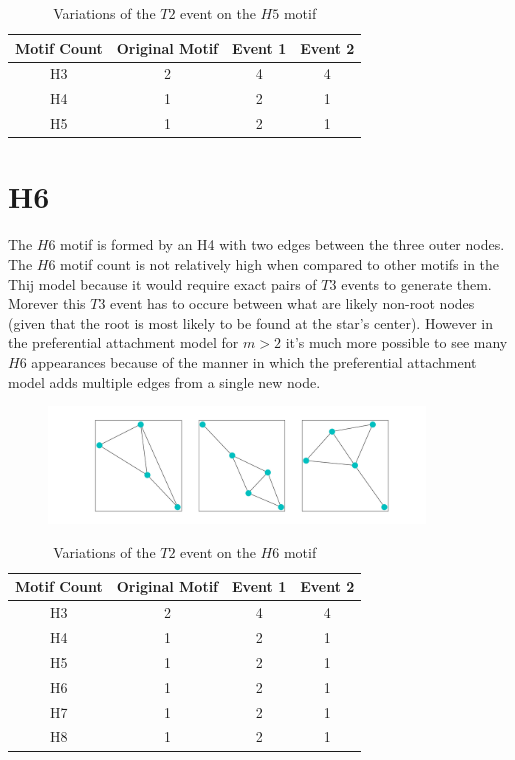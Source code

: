 \begin{table}
    \centering
    \begin{tabular}{||c c c c||} 
    \hline
    Motif Count & Original Motif & Event 1 & Event 2\\ [0.5ex] 
    \hline\hline
    H3 & 2 & 4 & 4\\ 
    \hline
    H4 & 1 & 2 & 1\\
    \hline
    H5 & 1 & 2 & 1\\
    \hline
   \end{tabular}
   \caption{Variations of the $T2$ event on the $H5$ motif}
    \label{table:3}
\end{table}


\section{H6}
The $H6$ motif is formed by an H4 with two edges between the three outer nodes.
The $H6$ motif count is not relatively high when compared to other motifs in the Thij
model because it would require exact pairs of $T3$ events to generate them. Morever this
$T3$ event has to occure between what are likely non-root nodes (given that the root is most likely to be found 
at the star's center). However in the preferential attachment model for $m>2$
it's much more possible to see many $H6$ appearances because of the manner in which 
the preferential attachment model adds multiple edges from a single new node.

\begin{figure}[!ht]
    \includegraphics[width=10cm]{Images/H6_evolution.png}
    \centering
\end{figure}
\FloatBarrier

\begin{table}
    \centering
    \begin{tabular}{||c c c c||} 
    \hline
    Motif Count & Original Motif & Event 1 & Event 2\\ [0.5ex] 
    \hline\hline
    H3 & 2 & 4 & 4\\ 
    \hline
    H4 & 1 & 2 & 1\\
    \hline
    H5 & 1 & 2 & 1\\
    \hline
    H6 & 1 & 2 & 1\\
    \hline
    H7 & 1 & 2 & 1\\
    \hline
    H8 & 1 & 2 & 1\\
    \hline
   \end{tabular}
   \caption{Variations of the $T2$ event on the $H6$ motif}
    \label{table:4}
\end{table}

